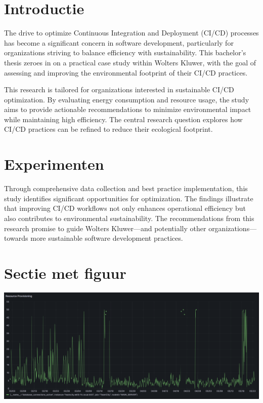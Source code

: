 \documentclass[a0,portrait]{hogent-poster}
\begin{document}
\begin{multicols}{2} %

\section{Introductie}

The drive to optimize Continuous Integration and Deployment (CI/CD) processes has become a significant concern in software development, particularly for organizations striving to balance efficiency with sustainability. This bachelor's thesis zeroes in on a practical case study within Wolters Kluwer, with the goal of assessing and improving the environmental footprint of their CI/CD practices.

This research is tailored for organizations interested in sustainable CI/CD optimization. By evaluating energy consumption and resource usage, the study aims to provide actionable recommendations to minimize environmental impact while maintaining high efficiency. The central research question explores how CI/CD practices can be refined to reduce their ecological footprint.

\section{Experimenten}
Through comprehensive data collection and best practice implementation, this study identifies significant opportunities for optimization. The findings illustrate that improving CI/CD workflows not only enhances operational efficiency but also contributes to environmental sustainability. The recommendations from this research promise to guide Wolters Kluwer—and potentially other organizations—towards more sustainable software development practices.

\section{Sectie met figuur}


\begin{center}
  \captionsetup{type=figure}
  \includegraphics[width=1.0\linewidth]{graphics/DB connections.png}
\end{center}


\end{multicols}
\end{document}
